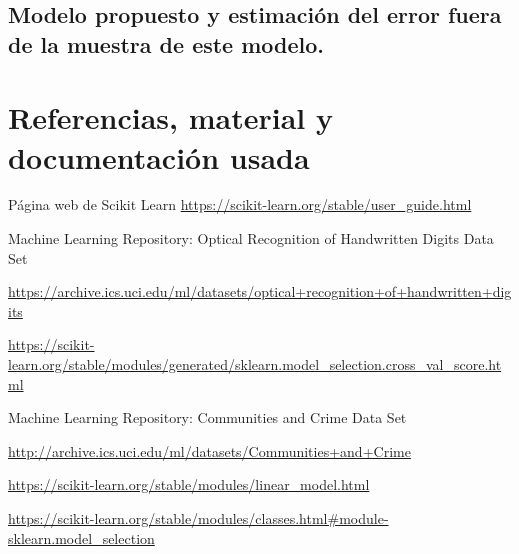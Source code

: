 \documentclass[12pt, spanish]{article}
\begin{document}
\subsection{Modelo propuesto y estimación del error fuera de la muestra de este modelo.}


\newpage


\section{Referencias, material y documentación usada}


\begin{thebibliography}{9}


Página web de Scikit Learn
\url{https://scikit-learn.org/stable/user_guide.html}


Machine Learning Repository: Optical Recognition of Handwritten Digits Data Set 

\url{https://archive.ics.uci.edu/ml/datasets/optical+recognition+of+handwritten+digits}


\url{https://scikit-learn.org/stable/modules/generated/sklearn.model_selection.cross_val_score.html}


Machine Learning Repository: Communities and Crime Data Set  

\url{http://archive.ics.uci.edu/ml/datasets/Communities+and+Crime}

\url{https://scikit-learn.org/stable/modules/linear_model.html}

\url{https://scikit-learn.org/stable/modules/classes.html#module-sklearn.model_selection}

\end{thebibliography}
\end{document}

